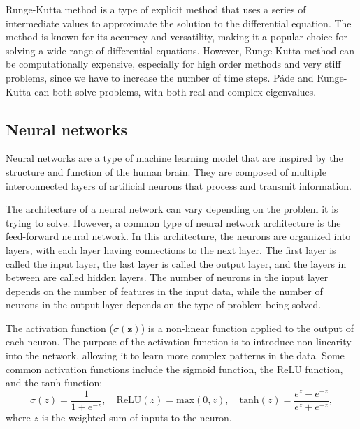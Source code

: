 \documentclass[10pt]{article}
\begin{document}
Runge-Kutta method is a type of explicit method that uses a series of intermediate values to approximate the solution to the differential equation. The method is known for its accuracy and versatility, making it a popular choice for solving a wide range of differential equations. However, Runge-Kutta method can be computationally expensive, especially for high order methods and very stiff problems, since we have to increase the number of time steps. P\'ade and Runge-Kutta can both solve problems, with both real and complex eigenvalues.

\subsection{Neural networks}
Neural networks are a type of machine learning model that are inspired by the structure and function of the human brain. They are composed of multiple interconnected layers of artificial neurons that process and transmit information. 

The architecture of a neural network can vary depending on the problem it is trying to solve. However, a common type of neural network architecture is the feed-forward neural network. In this architecture, the neurons are organized into layers, with each layer having connections to the next layer. The first layer is called the input layer, the last layer is called the output layer, and the layers in between are called hidden layers. The number of neurons in the input layer depends on the number of features in the input data, while the number of neurons in the output layer depends on the type of problem being solved.

The activation function ($\sigma(\mathbf{z})$) is a non-linear function applied to the output of each neuron. The purpose of the activation function is to introduce non-linearity into the network, allowing it to learn more complex patterns in the data. Some common activation functions include the sigmoid function, the ReLU function, and the tanh function:
\begin{equation*}
\sigma(z) = \frac{1}{1 + e^{-z}},\quad\text{ReLU}(z) = \text{max}(0,z),\quad\text{tanh}(z) = \frac{e^z - e^{-z}}{e^z + e^{-z}},
\end{equation*}
where $z$ is the weighted sum of inputs to the neuron.
\end{document}
